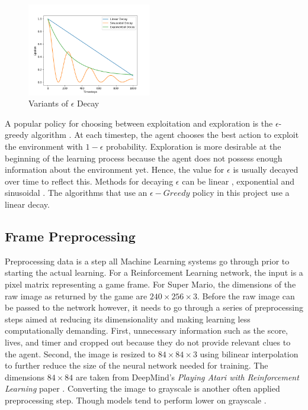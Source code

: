 \documentclass[notitlepage,a4paper,11pt]{article}
\begin{document}
\begin{figure}
\vspace{-40pt}
  \begin{center}
    \includegraphics[width=0.48\textwidth]{figs/epsilon_decay.png}
  \end{center}
  \vspace{-20pt}
  \caption{Variants of $\epsilon$ Decay}
  \vspace{-40pt}
\end{figure}

A popular policy for choosing between exploitation and exploration is the $\epsilon$-greedy algorithm \cite{white2012bandit}. At each timestep, the agent chooses the best action to exploit the environment with $1-\epsilon$ probability. Exploration is more desirable at the beginning of the learning process because the agent does not possess enough information about the environment yet. Hence, the value for $\epsilon$ is usually decayed over time to reflect this. Methods for decaying $\epsilon$ can be linear \cite{mnih2015human}, exponential \cite{maroti2019rbed} and sinusoidal  \cite{chuchro2017game}. The algorithms that use an $\epsilon-Greedy$ policy in this project use a linear decay.


\subsection{Frame Preprocessing} \label{frame_preprocessing}
Preprocessing data is a step all Machine Learning systems go through prior to starting the actual learning. For a Reinforcement Learning network, the input is a pixel matrix representing a game frame. For Super Mario, the dimensions of the raw image as returned by the game are $240 \times 256 \times 3$. Before the raw image can be passed to the network however, it needs to go through a series of preprocessing steps aimed at reducing its dimensionality and making learning less computationally demanding. First, unnecessary information such as the score, lives, and timer and cropped out because they do not provide relevant clues to the agent. Second, the image is resized to $84 \times 84 \times 3$ using bilinear interpolation \cite{gribbon2004novel} to further reduce the size of the neural network needed for training. The dimensions $84 \times 84$ are taken from DeepMind's \textit{Playing Atari with Reinforcement Learning} paper \cite{DBLP:journals/corr/MnihKSGAWR13}. Converting the image to grayscale is another often applied preprocessing step. Though models tend to perform lower on grayscale \cite{lample2017playing}.
\end{document}
